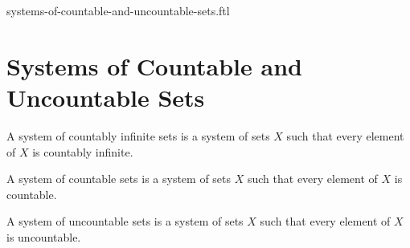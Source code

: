 \documentclass{naproche-library}
\begin{document}
\begin{smodule}{systems-of-countable-and-uncountable-sets.ftl}

  \section*{Systems of Countable and Uncountable Sets}

  \begin{definition}[forthel,id=FOUNDATIONS_14_3786392159125504]
    A system of countably infinite sets is a system of sets $X$ such that every element of $X$ is countably infinite.
  \end{definition}

  \begin{definition}[forthel,id=FOUNDATIONS_14_7341152585908224]
    A system of countable sets is a system of sets $X$ such that every element of $X$ is countable.
  \end{definition}

  \begin{definition}[forthel,id=FOUNDATIONS_14_6106935677943808]
    A system of uncountable sets is a system of sets $X$ such that every element of $X$ is uncountable.
  \end{definition}
\end{smodule}
\end{document}
